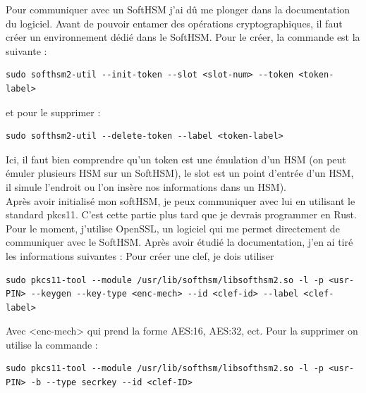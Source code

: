 \documentclass[a4paper, 12pt]{article}
\begin{document}
Pour communiquer avec un SoftHSM j'ai dû me plonger dans la documentation du logiciel. Avant de pouvoir entamer des opérations cryptographiques, il faut créer un environnement dédié dans le SoftHSM. 
Pour le créer, la commande est la suivante :
\begin{center}
\begin{minipage}{\linewidth}
\begin{lstlisting}[language = shell]
sudo softhsm2-util --init-token --slot <slot-num> --token <token-label>
\end{lstlisting}
\end{minipage}
\end{center}
et pour le supprimer :
\begin{center}
\begin{minipage}{\linewidth}
\begin{lstlisting}[language = shell]
sudo softhsm2-util --delete-token --label <token-label>
\end{lstlisting}
\end{minipage}
\end{center}
Ici, il faut bien comprendre qu'un token est une émulation d'un HSM (on peut émuler plusieurs HSM sur un SoftHSM), le slot est un point d'entrée d'un HSM, il simule l'endroit ou l'on insère nos informations dans un HSM). \\
Après avoir initialisé mon softHSM, je peux communiquer avec lui en utilisant le standard pkcs11. C'est cette partie plus tard que je devrais programmer en Rust. Pour le moment, j'utilise OpenSSL, un logiciel qui me permet directement de communiquer avec le SoftHSM. Après avoir étudié la documentation, j'en ai tiré les informations suivantes : Pour créer une clef, je dois utiliser 
\begin{center}
\begin{minipage}{\linewidth}
\begin{lstlisting}[language = shell]
sudo pkcs11-tool --module /usr/lib/softhsm/libsofthsm2.so -l -p <usr-PIN> --keygen --key-type <enc-mech> --id <clef-id> --label <clef-label>
\end{lstlisting}
\end{minipage}
\end{center}
Avec <enc-mech> qui prend la forme AES:16, AES:32, ect. Pour la supprimer on utilise la commande : 
\begin{center}
\begin{minipage}{\linewidth}
\begin{lstlisting}[language = shell]
sudo pkcs11-tool --module /usr/lib/softhsm/libsofthsm2.so -l -p <usr-PIN> -b --type secrkey --id <clef-ID>
\end{lstlisting}
\end{minipage}
\end{center}
\end{document}
